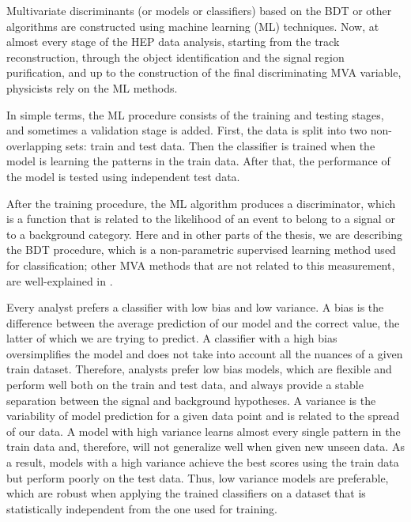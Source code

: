 Multivariate discriminants (or models or classifiers) based on the BDT or other algorithms are constructed using machine learning (ML) techniques. Now, at almost every stage of the HEP data analysis, starting from the track reconstruction, through the object identification and the signal region purification, and up to the construction of the final discriminating MVA variable, physicists rely on the ML methods.

In simple terms, the ML procedure consists of the training and testing stages, and sometimes a validation stage is added. First, the data is split into two non-overlapping sets: train and test data. Then the classifier is trained when the model is learning the patterns in the train data. After that, the performance of the model is tested using independent test data. 

After the training procedure, the ML algorithm produces a discriminator, which is a function that is related to the likelihood of an event to belong to a signal or to a background category. Here and in other parts of the thesis, we are describing the BDT procedure, which is a non-parametric supervised learning method used for classification; other MVA methods that are not related to this measurement, are well-explained in \cite{book:411471}. 

Every analyst prefers a classifier with low bias and low variance. A bias is the difference between the average prediction of our model and the correct value, the latter of which we are trying to predict. A classifier with a high bias oversimplifies the model and does not take into account all the nuances of a given train dataset. Therefore, analysts prefer low bias models, which are flexible and perform well both on the train and test data, and always provide a stable separation between the signal and background hypotheses. A variance is the variability of model prediction for a given data point and is related to the spread of our data. A model with high variance learns almost every single pattern in the train data and, therefore, will not generalize well when given new unseen data. As a result, models with a high variance achieve the best scores using the train data but perform poorly on the test data. Thus, low variance models are preferable, which are robust when applying the trained classifiers on a dataset that is statistically independent from the one used for training.

